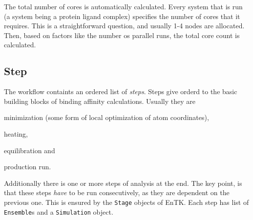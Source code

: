 




The total number of cores is automatically calculated. Every system that is run (a system being a protein ligand complex) specifies the number of cores that it requires. This is a straightforward question, and usually 1-4 nodes are allocated. Then, based on factors like the number os parallel runs, the total core count is calculated.

\subsection{Step}

The workflow containts an ordered list of \emph{steps}. Steps give orderd to the basic building blocks of binding affinity calculations. Usually they are
\begin{enumerate*}[label=(\roman*)]
  \item minimization (some form of local optimization of atom coordinates),
  \item heating,
  \item equilibration and
  \item production run.
\end{enumerate*}
Additionally there is one or more steps of analysis at the end. The key point, is that these steps \emph{have} to be run consecutively, as they are dependent on the previous one. This is ensured by the \texttt{Stage} objects of EnTK. Each step has list of \texttt{Ensemble}s and a \texttt{Simulation} object.

